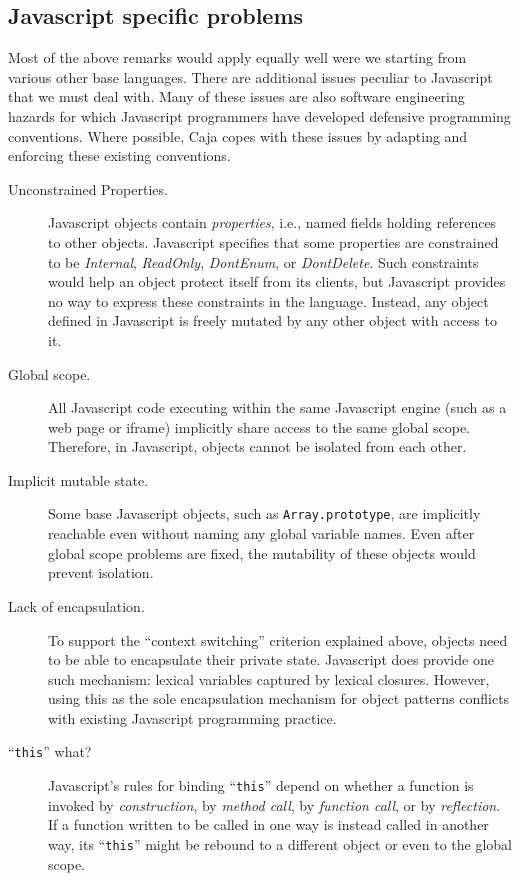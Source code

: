 \documentclass[letterpaper,twocolumn,10pt]{article}
\newcommand{\code}[1]{{\tt {#1}}}              %
\begin{document}
\subsection{Javascript specific problems}

Most of the above remarks would apply equally well were we starting from 
various other base languages. There are additional issues peculiar to 
Javascript that we must deal with. Many of these issues are also software 
engineering hazards for which Javascript programmers have developed 
defensive programming conventions. Where possible, Caja copes with these 
issues by adapting and enforcing these existing conventions.

\begin{description}

  \item[Unconstrained Properties.] Javascript objects contain 
  \emph{properties}, i.e., named fields holding references to other objects. 
  Javascript specifies that some properties are constrained to be 
  \emph{Internal}, \emph{ReadOnly}, \emph{DontEnum}, or \emph{DontDelete}. 
  Such constraints would help an object protect itself from its clients, but 
  Javascript provides no way to express these constraints in the language.
  Instead, any object defined in Javascript is freely mutated by any other
  object with access to it. 
  
  \item[Global scope.] All Javascript code executing within the same
  Javascript engine (such as a web page or iframe) implicitly share access to
  the same global scope. Therefore, in Javascript, objects cannot be isolated
  from each other.

  \item[Implicit mutable state.] Some base Javascript objects, such as 
  \code{Array.prototype}, are implicitly reachable even without naming any 
  global variable names. Even after global scope problems are fixed, the 
  mutability of these objects would prevent isolation.

  \item[Lack of encapsulation.] To support the ``context switching'' 
  criterion explained above, objects need to be able to encapsulate their 
  private state. Javascript does provide one such mechanism: lexical 
  variables captured by lexical closures. However, using this as the sole 
  encapsulation mechanism for object patterns conflicts with existing 
  Javascript programming practice.

  \item[``\code{this}'' what?] Javascript's rules for binding ``\code{this}'' 
  depend on whether a function is invoked by \emph{construction}, by 
  \emph{method call}, by \emph{function call}, or by \emph{reflection}. If a 
  function written to be called in one way is instead called in another way, 
  its ``\code{this}'' might be rebound to a different object or even to the 
  global scope.


\end{description}
\end{document}
